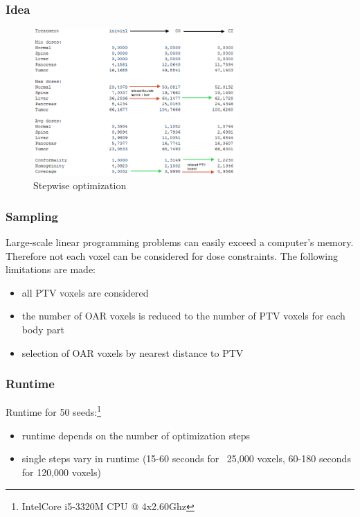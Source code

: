 \documentclass{beamer}
\begin{document}
	\begin{frame}
	\frametitle{Idea}
		\begin{figure}[h]
		\centering
		\includegraphics[width=0.7\textwidth]{pictures/stepwise}
		\caption{Stepwise optimization}
		\end{figure}
	\end{frame}
	
	\begin{frame}
	\frametitle{Sampling}
		Large-scale linear programming problems can easily exceed a computer's memory.
		Therefore not each voxel can be considered for dose constraints. The following limitations are made:
		\begin{itemize}
			\item all PTV voxels are considered
			\item the number of OAR voxels is reduced to the number of PTV voxels for each body part
			\item selection of OAR voxels by nearest distance to PTV
		\end{itemize}
	\end{frame}	
	
	\begin{frame}
	\frametitle{Runtime}
 		Runtime for 50 seeds:\footnote{Intel\textregistered  Core i5-3320M CPU @ 4x2.60Ghz}
 
		\begin{itemize}
			\item runtime depends on the number of optimization steps
			\item single steps vary in runtime (15-60 seconds for ~25,000 voxels, 60-180 seconds for 120,000 voxels)
		\end{itemize}  
	\end{frame}
\end{document}
